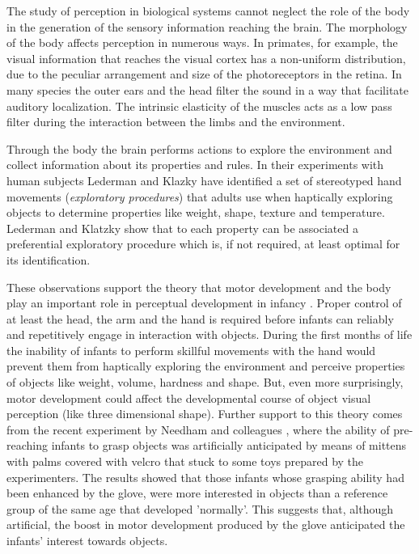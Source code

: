 
The study of perception in biological systems cannot neglect the role
of the body in the generation of the sensory information reaching the
brain.  The morphology of the body affects perception in numerous
ways. In primates, for example, the visual information that reaches
the visual cortex has a non-uniform distribution, due to the peculiar
arrangement and size of the photoreceptors in the retina. In many
species the outer ears and the head filter the sound in a way that
facilitate auditory localization. The intrinsic elasticity of the
muscles acts as a low pass filter during the interaction between the
limbs and the environment.

Through the body the brain performs actions to explore the environment
and collect information about its properties and rules. In their
experiments with human subjects Lederman and Klazky
\cite{lederman87hand} have identified a set of stereotyped hand
movements ({\it exploratory procedures}) that adults use when
haptically exploring objects to determine properties like weight,
shape, texture and temperature. Lederman and Klatzky show that to each
property can be associated a preferential exploratory procedure which
is, if not required, at least optimal for its identification.


These observations support the theory that motor development and the
body play an important role in perceptual development in infancy
\cite{bushnell93motor}. Proper control of at least the head, the arm
and the hand is required before infants can reliably and repetitively
engage in interaction with objects. During the first months of life
the inability of infants to perform skillful movements with the hand
would prevent them from haptically exploring the environment and
perceive properties of objects like weight, volume, hardness and
shape. But, even more surprisingly, motor development could affect the
developmental course of object visual perception (like three
dimensional shape).
%
Further support to this theory comes from the recent experiment by
Needham and colleagues \cite{Needham02apick-me-up}, where the ability
of pre-reaching infants to grasp objects was artificially anticipated
by means of mittens with palms covered with velcro that stuck to some
toys prepared by the experimenters. The results showed that those
infants whose grasping ability had been enhanced by the glove, were
more interested in objects than a reference group of the same age that
developed 'normally'. This suggests that, although artificial, the
boost in motor development produced by the glove anticipated the
infants' interest towards objects.

